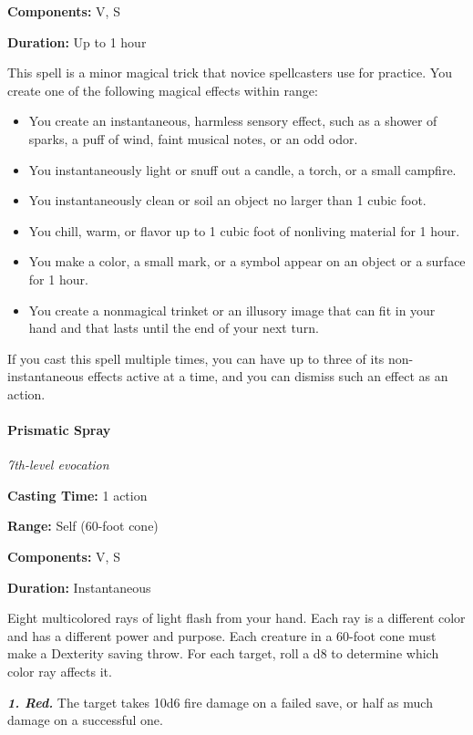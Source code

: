 \documentclass[
]{article}
\providecommand{\tightlist}{%
  \setlength{\itemsep}{0pt}\setlength{\parskip}{0pt}}
\begin{document}
\textbf{Components:} V, S

\textbf{Duration:} Up to 1 hour

This spell is a minor magical trick that novice spellcasters use for
practice. You create one of the following magical effects within range:

\begin{itemize}
\tightlist
\item
  You create an instantaneous, harmless sensory effect, such as a shower
  of sparks, a puff of wind, faint musical notes, or an odd odor.
\item
  You instantaneously light or snuff out a candle, a torch, or a small
  campfire.
\item
  You instantaneously clean or soil an object no larger than 1 cubic
  foot.
\item
  You chill, warm, or flavor up to 1 cubic foot of nonliving material
  for 1 hour.
\item
  You make a color, a small mark, or a symbol appear on an object or a
  surface for 1 hour.
\item
  You create a nonmagical trinket or an illusory image that can fit in
  your hand and that lasts until the end of your next turn.
\end{itemize}

If you cast this spell multiple times, you can have up to three of its
non-instantaneous effects active at a time, and you can dismiss such an
effect as an action.

\hypertarget{prismatic-spray}{%
\paragraph{Prismatic Spray}\label{prismatic-spray}}

\emph{7th-level evocation}

\textbf{Casting Time:} 1 action

\textbf{Range:} Self (60-foot cone)

\textbf{Components:} V, S

\textbf{Duration:} Instantaneous

Eight multicolored rays of light flash from your hand. Each ray is a
different color and has a different power and purpose. Each creature in
a 60-foot cone must make a Dexterity saving throw. For each target, roll
a d8 to determine which color ray affects it.

\emph{\textbf{1. Red.}} The target takes 10d6 fire damage on a failed
save, or half as much damage on a successful one.
\end{document}
